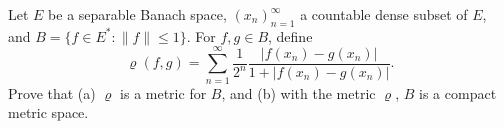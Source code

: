Let $E$ be a separable Banach space, $(x_n)_{n=1}^{\infty}$ a countable dense subset of $E$, and $B = \{f \in E^* : \|f\| \leq 1\}$. For $f, g \in B$, define
$$\varrho(f, g) = \sum_{n=1}^{\infty} \frac{1}{2^n} \frac{|f(x_n) - g(x_n)|}{1 + |f(x_n) - g(x_n)|}.$$
Prove that (a) $\varrho$ is a metric for $B$, and (b) with the metric $\varrho$, $B$ is a compact metric space.
